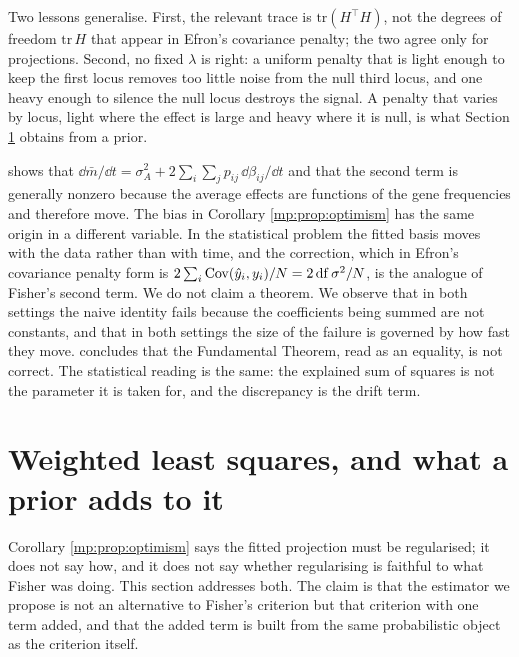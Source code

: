\begin{example}
Two lessons generalise. First, the relevant trace is $\mathrm{tr}(H^\top H)$, not the
degrees of freedom $\mathrm{tr}\,H$ that appear in Efron's covariance penalty; the two agree
only for projections. Second, no fixed $\lambda$ is right: a uniform penalty that is light
enough to keep the first locus removes too little noise from the null third locus, and one
heavy enough to silence the null locus destroys the signal. A penalty that varies by locus,
light where the effect is large and heavy where it is null, is what Section \ref{mp:sec:wls}
obtains from a prior.
\end{example}

\begin{remark}
\label{mp:rem:eq15}
\citet{mp:ewens2024} shows that
$\dd\bar m/\dd t=\sigma_A^2+2\sum_i\sum_j p_{ij}\,\dd\beta_{ij}/\dd t$ and that the second
term is generally nonzero because the average effects are functions of the gene frequencies
and therefore move. The bias in Corollary \ref{mp:prop:optimism} has the same origin in a
different variable. In the statistical problem the fitted basis moves with the data rather
than with time, and the correction, which in Efron's covariance penalty form is
$2\sum_i\mathrm{Cov}(\hat y_i,y_i)/N=2\,\mathrm{df}\,\sigma^2/N$, is the analogue of Fisher's second
term. We do not claim a theorem. We observe that in both settings the naive identity fails
because the coefficients being summed are not constants, and that in both settings the size
of the failure is governed by how fast they move. \citet{mp:ewens2024} concludes that the
Fundamental Theorem, read as an equality, is not correct. The statistical reading is the
same: the explained sum of squares is not the parameter it is taken for, and the discrepancy
is the drift term.
\end{remark}

\section{Weighted least squares, and what a prior adds to it}
\label{mp:sec:wls}

Corollary \ref{mp:prop:optimism} says the fitted projection must be regularised; it does not say
how, and it does not say whether regularising is faithful to what Fisher was doing. This
section addresses both. The claim is that the estimator we propose is not an alternative to
Fisher's criterion but that criterion with one term added, and that the added term is built
from the same probabilistic object as the criterion itself.

